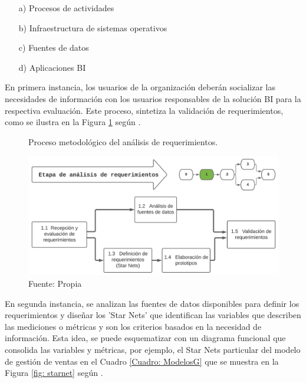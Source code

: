 \documentclass[12pt,jou]{apa7}
\begin{document}
\begin{itemize}
\item[a)] Procesos de actividades
\item[b)] Infraestructura de sistemas operativos
\item[c)] Fuentes de datos
\item[d)] Aplicaciones BI
\end{itemize}

En primera instancia, los usuarios de la organización deberán socializar las necesidades de información con los usuarios responsables de la solución BI para la respectiva evaluación. Este proceso, sintetiza la validación de requerimientos, como se ilustra en la Figura \ref{fig: etapa0} según \cite{LaPlata}.

\begin{figure}[h]
\caption{Proceso metodológico del análisis de requerimientos.}
\centering
\includegraphics[width=1\linewidth]{Figuras/etapa1}
\caption*{ Fuente: Propia}
\label{fig: etapa0}
\end{figure}

En segunda instancia, se analizan las fuentes de datos disponibles para definir los requerimientos y diseñar los 'Star Nets' que identifican las variables que describen las mediciones o métricas y son los criterios basados en la necesidad de información. Esta idea, se puede esquematizar con un diagrama funcional que consolida las variables y métricas, por ejemplo, el Star Nets particular del modelo de gestión de ventas en el Cuadro \ref{Cuadro: ModelosG} que se muestra en la Figura \ref{fig: starnet} según \cite{LaPlata}.
\end{document}
